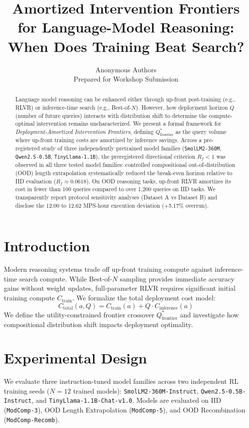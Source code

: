 \documentclass{article}
\title{Amortized Intervention Frontiers for Language-Model Reasoning: \\ When Does Training Beat Search?}
\author{%
  Anonymous Authors \\
  Prepared for Workshop Submission \\
}
\begin{document}
\maketitle

\begin{abstract}
Language model reasoning can be enhanced either through up-front post-training (e.g., RLVR) or inference-time search (e.g., Best-of-$N$). However, how deployment horizon $Q$ (number of future queries) interacts with distribution shift to determine the compute-optimal intervention remains uncharacterized. We present a formal framework for \emph{Deployment-Amortized Intervention Frontiers}, defining $Q^*_{\text{frontier}}$ as the query volume where up-front training costs are amortized by inference savings. Across a pre-registered study of three independently pretrained model families (\texttt{SmolLM2-360M}, \texttt{Qwen2.5-0.5B}, \texttt{TinyLlama-1.1B}), the preregistered directional criterion $R_f < 1$ was observed in all three tested model families: controlled compositional out-of-distribution (OOD) length extrapolation systematically reduced the break-even horizon relative to IID evaluation ($R_f \approx 0.0618$). On OOD reasoning tasks, up-front RLVR amortizes its cost in fewer than 100 queries compared to over 1,200 queries on IID tasks. We transparently report protocol sensitivity analyses (Dataset A vs Dataset B) and disclose the 12.00 to 12.62 MPS-hour execution deviation (+5.17\% overrun).
\end{abstract}

\section{Introduction}
Modern reasoning systems trade off up-front training compute against inference-time search compute. While Best-of-$N$ sampling provides immediate accuracy gains without weight updates, full-parameter RLVR requires significant initial training compute $C_{\text{train}}$. We formalize the total deployment cost model:
\begin{equation}
C_{\text{total}}(a, Q) = C_{\text{train}}(a) + Q \cdot C_{\text{inference}}(a)
\end{equation}
We define the utility-constrained frontier crossover $Q^*_{\text{frontier}}$ and investigate how compositional distribution shift impacts deployment optimality.

\section{Experimental Design}
We evaluate three instruction-tuned model families across two independent RL training seeds ($N=12$ trained models): \texttt{SmolLM2-360M-Instruct}, \texttt{Qwen2.5-0.5B-Instruct}, and \texttt{TinyLlama-1.1B-Chat-v1.0}. Models are evaluated on IID (\texttt{ModComp-3}), OOD Length Extrapolation (\texttt{ModComp-5}), and OOD Recombination (\texttt{ModComp-Recomb}).
\end{document}
